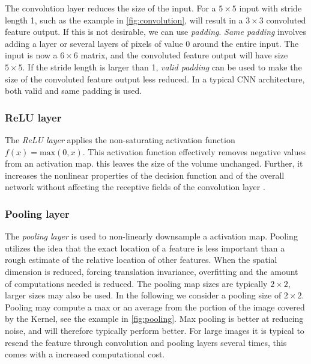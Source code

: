 \documentclass[../main.tex]{subfiles}
\begin{document}
The convolution layer reduces the size of the input. For a \ensuremath{5\times5} input with stride length 1, such as the example in \cref{fig:convolution}, will result in a \ensuremath{3\times3} convoluted feature output. If this is not desirable, we can use \textit{padding}. \textit{Same padding} involves adding a layer or several layers of pixels of value 0 around the entire input. The input is now a \ensuremath{6\times6} matrix, and the convoluted feature output will have size \ensuremath{5\times5}. If the stride length is larger than 1, \textit{valid padding} can be used to make the size of the convoluted feature output less reduced. In a typical CNN architecture, both valid and same padding is used. 

\subsubsection{ReLU layer}
The \textit{ReLU layer} applies the non-saturating activation function \ensuremath{f(x)=\text{max}(0,x)}. This activation function effectively removes negative values from an activation map. this leaves the size of the volume unchanged. Further, it increases the nonlinear properties of the decision function and of the overall network without affecting the receptive fields of the convolution layer \cite{wiki:xxx}.  

\subsubsection{Pooling layer}
The \textit{pooling layer} is used to non-linearly downsample a activation map. Pooling utilizes the idea that the exact location of a feature is less important than a rough estimate of the relative location of other features. When the spatial dimension is reduced, forcing translation invariance, overfitting and the amount of computations needed is reduced. The pooling map sizes are typically \ensuremath{2\times2}, larger sizes may also be used. In the following we consider a pooling size of \ensuremath{2\times2}. Pooling may compute a max or an average from the portion of the image covered by the Kernel, see the example in \cref{fig:pooling}. Max pooling is better at reducing noise, and will therefore typically perform better. For large images it is typical to resend the feature through convolution and pooling layers several times, this comes with a increased computational cost. 
\end{document}
